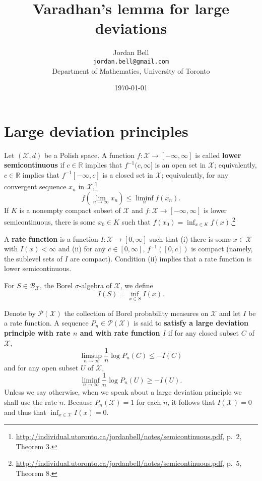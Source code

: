 \documentclass{article}
\theoremstyle{definition}
\begin{document}
\title{Varadhan's lemma for large deviations}
\author{Jordan Bell\\ \texttt{jordan.bell@gmail.com}\\Department of Mathematics, University of Toronto}
\date{\today}

\maketitle


\section{Large deviation principles}
Let $(\mathcal{X},d)$ be a Polish space.
A function
$f:\mathcal{X} \to [-\infty,\infty]$ is called \textbf{lower semicontinuous} if  $c \in \mathbb{R}$ implies that
$f^{-1}(c,\infty]$ is an open set in $\mathcal{X}$;
equivalently, $c \in \mathbb{R}$ implies that $f^{-1}[-\infty,c]$ is a closed set in $\mathcal{X}$;
equivalently,
for any convergent sequence $x_n$ in $\mathcal{X}$,\footnote{\url{http://individual.utoronto.ca/jordanbell/notes/semicontinuous.pdf},
p.~2, Theorem 3.}
\[
f(\lim_{n \to \infty} x_n) \leq \liminf_n f(x_n).
\]
If $K$ is a nonempty compact subset of $\mathcal{X}$ and $f:\mathcal{X} \to [-\infty,\infty]$ is lower semicontinuous, 
there is some $x_0 \in K$ such that $f(x_0) = \inf_{x \in K} f(x)$.\footnote{\url{http://individual.utoronto.ca/jordanbell/notes/semicontinuous.pdf},
p.~5, Theorem 8.}

A \textbf{rate function} is a function $I:\mathcal{X} \to [0,\infty]$ such that (i)
there is some $x \in \mathcal{X}$ with $I(x) < \infty$ and (ii)
for any $c \in [0,\infty]$, $f^{-1}([0,c])$ is compact (namely, the sublevel sets of $I$ are compact).
Condition (ii) implies that a rate function is lower semicontinuous.

For $S \in \mathscr{B}_\mathcal{X}$, the Borel $\sigma$-algebra of $\mathcal{X}$, we define
\[
I(S) = \inf_{x \in S} I(x).
\]

Denote by $\mathscr{P}(\mathcal{X})$ the collection of Borel probability measures on $\mathcal{X}$ and let $I$
be a rate function. A sequence
$P_n \in \mathscr{P}(\mathcal{X})$  is said to \textbf{satisfy a large deviation principle with rate $n$ and   with rate function $I$}
if for any closed subset $C$ of $\mathcal{X}$,
\[
\limsup_{n \to \infty} \frac{1}{n} \log P_n(C) \leq -I(C) 
\]
and for any open subset $U$ of $\mathcal{X}$,
\[
\liminf_{n \to \infty} \frac{1}{n} \log P_n(U) \geq -I(U).
\]
Unless we say otherwise, when we speak about a large deviation principle we shall use the rate $n$.
Because $P_n(\mathcal{X})=1$ for each $n$, it follows that $I(\mathcal{X})=0$ and thus that $\inf_{x \in \mathcal{X}} I(x)=0$.
\end{document}
